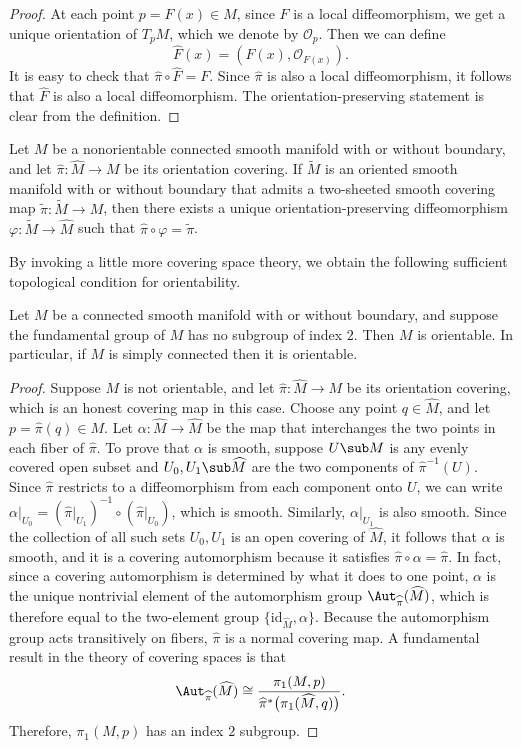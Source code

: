 \begin{proof}
At each point $p=F(x)\in M$, since $F$ is a local diffeomorphism, we get a unique orientation of $T_pM$, which we denote by $\mathcal{O}_p$. Then we can define
\[\widehat{F}(x)=(F(x),\mathcal{O}_{F(x)}).\]
It is easy to check that $\widehat{\pi}\circ\widehat{F}=F$. Since $\widehat{\pi}$ is also a local diffeomorphism, it follows that $\widehat{F}$ is also a local diffeomorphism. The orientation-preserving statement is clear from the definition.
\end{proof}
\begin{theorem}\label{orientation cover unique}
Let $M$ be a nonorientable connected smooth manifold with or without boundary, and let $\widehat{\pi}:\widehat{M}\to M$ be its orientation covering. If $\widetilde{M}$ is an oriented smooth manifold with or without boundary that admits a two-sheeted smooth covering map $\widetilde{\pi}:\widetilde{M}\to M$, then there exists a unique orientation-preserving diffeomorphism $\varphi:\widetilde{M}\to\widehat{M}$ such that $\widehat{\pi}\circ\varphi=\widetilde{\pi}$.
\end{theorem}
By invoking a little more covering space theory, we obtain the following sufficient
topological condition for orientability. 
\begin{theorem}
Let $M$ be a connected smooth manifold with or without boundary, and suppose the fundamental group of $M$ has no subgroup of index $2$. Then $M$ is orientable. In particular, if $M$ is simply connected then it is orientable.
\end{theorem}
\begin{proof}
Suppose $M$ is not orientable, and let $\widehat{\pi}:\widehat{M}\to M$ be its orientation covering, which is an honest covering map in this case. Choose any point $q\in\widehat{M}$, and let $p=\widehat{\pi}(q)\in M$. Let $\alpha:\widehat{M}\to\widehat{M}$ be the map that interchanges the two points in each fiber of $\widehat{\pi}$. To prove that $\alpha$ is smooth, suppose $U\sub M$ is any evenly covered open subset and $U_0,U_1\sub\widehat{M}$ are the two components of $\widehat{\pi}^{-1}(U)$. Since $\widehat{\pi}$ restricts to a diffeomorphism from each component onto $U$, we can write $\alpha|_{U_0}=(\widehat{\pi}|_{U_1})^{-1}\circ(\widehat{\pi}|_{U_0})$, which is smooth. Similarly, $\alpha|_{U_1}$ is also smooth. Since the collection of all such sets $U_0,U_1$ is an open covering of $\widehat{M}$, it follows that $\alpha$ is smooth, and it is a covering automorphism because it satisfies $\widehat{\pi}\circ\alpha=\widehat{\pi}$. In fact, since a covering automorphism is determined by what it does to one point, $\alpha$ is the unique nontrivial element of the automorphism group $\Aut_{\widehat{\pi}}(\widehat{M})$, which is therefore
equal to the two-element group $\{\mathrm{id}_{\widehat{M}},\alpha\}$. Because the automorphism group acts transitively on fibers, $\widehat{\pi}$ is a normal covering map. A fundamental result in the theory of covering spaces is that
\[\Aut_{\widehat{\pi}}(\widehat{M})\cong\frac{\pi_1(M,p)}{\widehat{\pi}^*\big(\pi_1(\widehat{M},q)\big)}.\]
Therefore, $\pi_1(M,p)$ has an index $2$ subgroup.
\end{proof}
